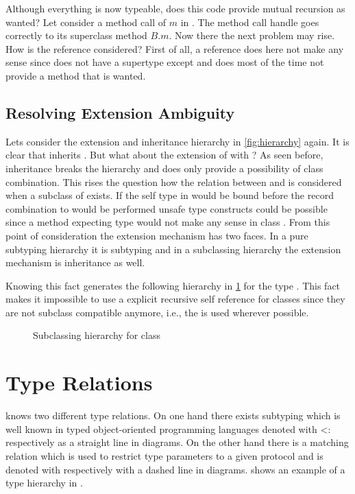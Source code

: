 Although everything is now typeable, does this code provide mutual
recursion as wanted?  Let consider a method call of $m$ in \C. The
method call handle goes correctly to its superclass method $B.m$. Now
there the next problem may rise. How is the \base reference considered?
First of all, a \base reference does here not make any sense since
\C does not have a supertype except \object and \object does most 
of the time not provide a method that is wanted.

\subsection{Resolving Extension Ambiguity}
\label{sec:resolveAmbiguity}
Lets consider the extension and inheritance hierarchy in \cref{fig:hierarchy}
again. It is clear that \C inherits \B. But what about the extension of \A 
with \B? As seen before, inheritance breaks the hierarchy and does only
provide a possibility of class combination. This rises the question how the 
relation between \A and \B is considered when a subclass of \B exists. If
the self type in \A would be bound before the record combination to
\C would be performed unsafe type constructs could be possible since a
method expecting type \A would not make any sense in class \C. From this
point of consideration the extension mechanism has two faces. In a pure
subtyping hierarchy it is subtyping and in a subclassing hierarchy the
extension mechanism is inheritance as well.

Knowing this fact generates the following hierarchy in
\cref{fig:fixedHierarchy} for the type \C. This fact makes it impossible
to use a explicit recursive self reference for classes since they are not
subclass compatible anymore, i.e., the \mytype is used wherever possible.

\begin{figure}[ht]
	\centering
	\caption{Subclassing hierarchy for class \C}
	\label{fig:fixedHierarchy}
\end{figure}
%

\section{Type Relations}
\ooplss knows two different type relations. On one hand there exists
subtyping which is well known in typed object-oriented programming
languages denoted with <: respectively as a straight line in diagrams. On
the other hand there is a matching relation which is used to restrict type
parameters to a given protocol and is denoted with \match respectively
with a dashed line in diagrams.  shows an example
of a type hierarchy in \ooplss.

